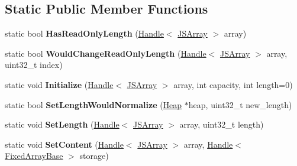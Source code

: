 \subsection*{Static Public Member Functions}
\begin{DoxyCompactItemize}
\item 
static bool {\bfseries Has\+Read\+Only\+Length} (\hyperlink{classv8_1_1internal_1_1_handle}{Handle}$<$ \hyperlink{classv8_1_1internal_1_1_j_s_array}{J\+S\+Array} $>$ array)\hypertarget{classv8_1_1internal_1_1_j_s_array_a0ebad386294cd7ba5e09f1289f84b23b}{}\label{classv8_1_1internal_1_1_j_s_array_a0ebad386294cd7ba5e09f1289f84b23b}

\item 
static bool {\bfseries Would\+Change\+Read\+Only\+Length} (\hyperlink{classv8_1_1internal_1_1_handle}{Handle}$<$ \hyperlink{classv8_1_1internal_1_1_j_s_array}{J\+S\+Array} $>$ array, uint32\+\_\+t index)\hypertarget{classv8_1_1internal_1_1_j_s_array_ab250b04720a407005395098e350026f5}{}\label{classv8_1_1internal_1_1_j_s_array_ab250b04720a407005395098e350026f5}

\item 
static void {\bfseries Initialize} (\hyperlink{classv8_1_1internal_1_1_handle}{Handle}$<$ \hyperlink{classv8_1_1internal_1_1_j_s_array}{J\+S\+Array} $>$ array, int capacity, int length=0)\hypertarget{classv8_1_1internal_1_1_j_s_array_ac34bb2e7768e194e679b3b1556b4e168}{}\label{classv8_1_1internal_1_1_j_s_array_ac34bb2e7768e194e679b3b1556b4e168}

\item 
static bool {\bfseries Set\+Length\+Would\+Normalize} (\hyperlink{classv8_1_1internal_1_1_heap}{Heap} $\ast$heap, uint32\+\_\+t new\+\_\+length)\hypertarget{classv8_1_1internal_1_1_j_s_array_aceeca4831590d83fe633b9471936e78e}{}\label{classv8_1_1internal_1_1_j_s_array_aceeca4831590d83fe633b9471936e78e}

\item 
static void {\bfseries Set\+Length} (\hyperlink{classv8_1_1internal_1_1_handle}{Handle}$<$ \hyperlink{classv8_1_1internal_1_1_j_s_array}{J\+S\+Array} $>$ array, uint32\+\_\+t length)\hypertarget{classv8_1_1internal_1_1_j_s_array_a393d220b4a4df41af5589d3c3774281b}{}\label{classv8_1_1internal_1_1_j_s_array_a393d220b4a4df41af5589d3c3774281b}

\item 
static void {\bfseries Set\+Content} (\hyperlink{classv8_1_1internal_1_1_handle}{Handle}$<$ \hyperlink{classv8_1_1internal_1_1_j_s_array}{J\+S\+Array} $>$ array, \hyperlink{classv8_1_1internal_1_1_handle}{Handle}$<$ \hyperlink{classv8_1_1internal_1_1_fixed_array_base}{Fixed\+Array\+Base} $>$ storage)\hypertarget{classv8_1_1internal_1_1_j_s_array_a41f6ed171dd4166868145bfbd59ae829}{}\label{classv8_1_1internal_1_1_j_s_array_a41f6ed171dd4166868145bfbd59ae829}


\end{DoxyCompactItemize}
